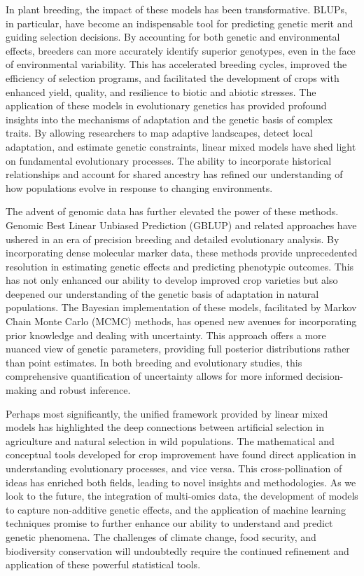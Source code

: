 \documentclass[12pt,a4paper]{article}
\begin{document}
In plant breeding, the impact of these models has been transformative. BLUPs, in particular, have become an indispensable tool for predicting genetic merit and guiding selection decisions. By accounting for both genetic and environmental effects, breeders can more accurately identify superior genotypes, even in the face of environmental variability. This has accelerated breeding cycles, improved the efficiency of selection programs, and facilitated the development of crops with enhanced yield, quality, and resilience to biotic and abiotic stresses. The application of these models in evolutionary genetics has provided profound insights into the mechanisms of adaptation and the genetic basis of complex traits. By allowing researchers to map adaptive landscapes, detect local adaptation, and estimate genetic constraints, linear mixed models have shed light on fundamental evolutionary processes. The ability to incorporate historical relationships and account for shared ancestry has refined our understanding of how populations evolve in response to changing environments.

The advent of genomic data has further elevated the power of these methods. Genomic Best Linear Unbiased Prediction (GBLUP) and related approaches have ushered in an era of precision breeding and detailed evolutionary analysis. By incorporating dense molecular marker data, these methods provide unprecedented resolution in estimating genetic effects and predicting phenotypic outcomes. This has not only enhanced our ability to develop improved crop varieties but also deepened our understanding of the genetic basis of adaptation in natural populations. The Bayesian implementation of these models, facilitated by Markov Chain Monte Carlo (MCMC) methods, has opened new avenues for incorporating prior knowledge and dealing with uncertainty. This approach offers a more nuanced view of genetic parameters, providing full posterior distributions rather than point estimates. In both breeding and evolutionary studies, this comprehensive quantification of uncertainty allows for more informed decision-making and robust inference.

Perhaps most significantly, the unified framework provided by linear mixed models has highlighted the deep connections between artificial selection in agriculture and natural selection in wild populations. The mathematical and conceptual tools developed for crop improvement have found direct application in understanding evolutionary processes, and vice versa. This cross-pollination of ideas has enriched both fields, leading to novel insights and methodologies. As we look to the future, the integration of multi-omics data, the development of models to capture non-additive genetic effects, and the application of machine learning techniques promise to further enhance our ability to understand and predict genetic phenomena. The challenges of climate change, food security, and biodiversity conservation will undoubtedly require the continued refinement and application of these powerful statistical tools.
\end{document}
